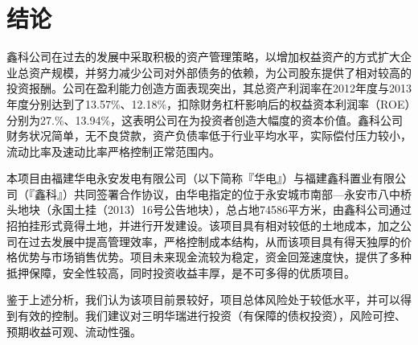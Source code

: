 
\chapter{结论}
\label{chap06}

鑫科公司在过去的发展中采取积极的资产管理策略，以增加权益资产的方式扩大企业总资产规模，并努力减少公司对外部债务的依赖，为公司股东提供了相对较高的投资报酬。公司在盈利能力创造方面表现突出，其总资产利润率在2012年度与2013年度分别达到了13.57\%、12.18\%，扣除财务杠杆影响后的权益资本利润率（ROE）分别为27.\%、13.94\%，这表明公司在为投资者创造大幅度的资本价值。鑫科公司财务状况简单，无不良贷款，资产负债率低于行业平均水平，实际偿付压力较小，流动比率及速动比率严格控制正常范围内。

本项目由福建华电永安发电有限公司（以下简称『华电』）与福建鑫科置业有限公司（『鑫科』）共同签署合作协议，由华电指定的位于永安城市南部—永安市八中桥头地块（永国土挂（2013）16号公告地块），总占地74586平方米，由鑫科公司通过招拍挂形式竟得土地，并进行开发建设。该项目具有相对较低的土地成本，加之公司在过去发展中提高管理效率，严格控制成本结构，从而该项目具有得天独厚的价格优势与市场销售优势。项目未来现金流较为稳定，资金回笼速度快，提供了多种抵押保障，安全性较高，同时投资收益丰厚，是不可多得的优质项目。

鉴于上述分析，我们认为该项目前景较好，项目总体风险处于较低水平，并可以得到有效的控制。我们建议对三明华瑞进行投资（有保障的债权投资），风险可控、预期收益可观、流动性强。